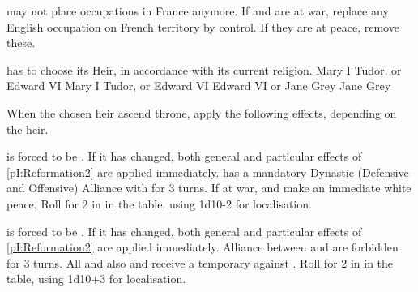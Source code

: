  

\newpage\startevents






\phevnt
\aparag[] [BLP] \ANG may not place occupations in France anymore. If \ANG and
\FRA are at war, replace any English occupation on French territory by
control. If they are at peace, remove these.

\aparag \ENG has to choose its Heir, in accordance with its current religion.
 Mary I Tudor, or Edward VI
\bparag[\CATHCR] Mary I Tudor, or Edward VI
\bparag[\CATHCO] Edward VI or Jane Grey
\bparag[\PROTPUR] Jane Grey

\aparag When the chosen heir ascend throne, apply the following effects,
depending on the heir.

 \ENG is forced to be \CATHCR.  If it has changed, both
general and particular effects of \ref{pI:Reformation2} are applied
immediately.
\bparag \ANG has a mandatory Dynastic (Defensive and Offensive) Alliance with
\SPA for 3 turns.  If at war, \SPA and \ENG make an immediate white peace.
\bparag Roll for 2 \REVOLT in \ENG in the table, using 1d10-2 for
localisation.

 \ENG is forced to be \PROTPUR.  If it has changed,
both general and particular effects of \ref{pI:Reformation2} are applied
immediately.
\bparag Alliance between \ENG and \SPA are forbidden for 3 turns.
\bparag All \CATHCR \MAJ and also \POR and \VEN receive a temporary \CB
against \ENG.
\bparag Roll for 2 \REVOLT in \ENG in the table, using 1d10+3 for
localisation.

